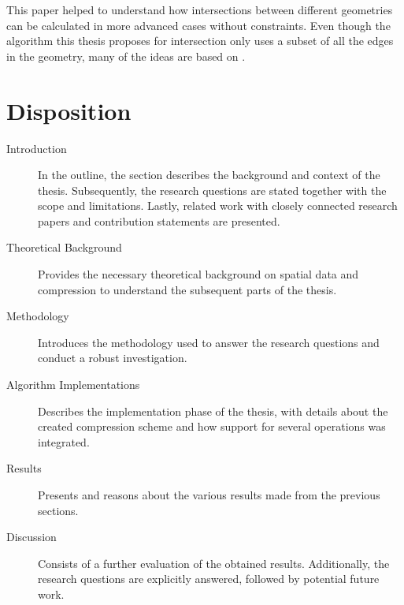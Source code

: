 This paper helped to understand how intersections between different geometries can be calculated in more advanced cases without constraints. Even though the algorithm this thesis proposes for intersection only uses a subset of all the edges in the geometry, many of the ideas are based on \citet{polygonclipping}.

\section{Disposition}

\begin{description}
    \item [Introduction] In the outline, the section describes the background and context of the thesis. Subsequently, the research questions are stated together with the scope and limitations. Lastly, related work with closely connected research papers and contribution statements are presented.
    
 
    \item [Theoretical Background] Provides the necessary theoretical background on spatial data and compression to understand the subsequent parts of the thesis.
    
    \item [Methodology] Introduces the methodology used to answer the research questions and conduct a robust investigation.
    
    \item [Algorithm Implementations] Describes the implementation phase of the thesis, with details about the created compression scheme and how support for several operations was integrated.
    
   
    \item [Results] Presents and reasons about the various results made from the previous sections.

    
    \item [Discussion] Consists of a further evaluation of the obtained results. Additionally, the research questions are explicitly answered, followed by potential future work.
\end{description}


